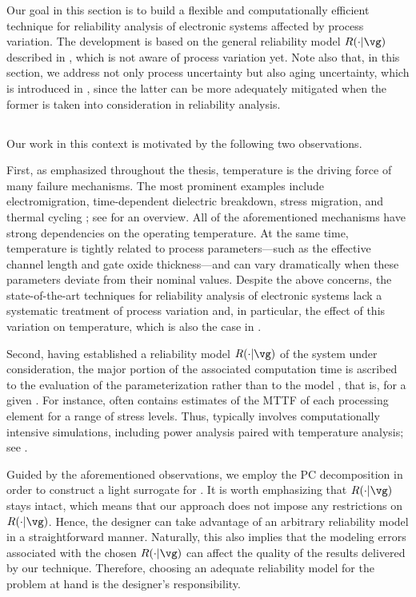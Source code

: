 Our goal in this section is to build a flexible and computationally efficient
technique for reliability analysis of electronic systems affected by process
variation. The development is based on the general reliability model $R(\cdot |
\vg)$ described in , which is not aware of process
variation yet. Note also that, in this section, we address not only process
uncertainty but also aging uncertainty, which is introduced in
, since the latter can be more adequately mitigated when
the former is taken into consideration in reliability analysis.

\subsection{\problemtitle}

Our work in this context is motivated by the following two observations.

First, as emphasized throughout the thesis, temperature is the driving force of
many failure mechanisms. The most prominent examples include electromigration,
time-dependent dielectric breakdown, stress migration, and thermal cycling
\cite{xiang2010}; see \cite{jedec2016} for an overview. All of the
aforementioned mechanisms have strong dependencies on the operating temperature.
At the same time, temperature is tightly related to process parameters---such as
the effective channel length and gate oxide thickness---and can vary
dramatically when these parameters deviate from their nominal values. Despite
the above concerns, the state-of-the-art techniques for reliability analysis of
electronic systems lack a systematic treatment of process variation and, in
particular, the effect of this variation on temperature, which is also the case
in .

Second, having established a reliability model $R(\cdot | \vg)$ of the system
under consideration, the major portion of the associated computation time is
ascribed to the evaluation of the parameterization \vg rather than to the model
\perse, that is, for a given \vg. For instance, \vg often contains estimates of
the \ac{MTTF} of each processing element for a range of stress levels. Thus, \vg
typically involves computationally intensive simulations, including power
analysis paired with temperature analysis; see .

Guided by the aforementioned observations, we employ the \ac{PC} decomposition
in order to construct a light surrogate for \vg. It is worth emphasizing that
$R(\cdot | \vg)$ stays intact, which means that our approach does not impose any
restrictions on $R(\cdot | \vg)$. Hence, the designer can take advantage of an
arbitrary reliability model in a straightforward manner. Naturally, this also
implies that the modeling errors associated with the chosen $R(\cdot | \vg)$ can
affect the quality of the results delivered by our technique. Therefore,
choosing an adequate reliability model for the problem at hand is the designer's
responsibility.

